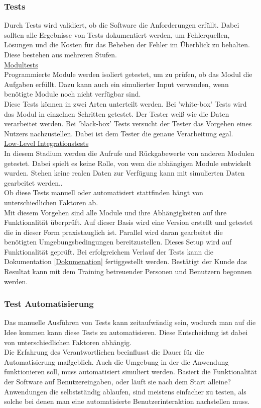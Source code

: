 \documentclass[12pt,a4paper]{article}
\begin{document}
\subsubsection{Tests}
\label{Tests}
Durch Tests wird validiert, ob die Software die Anforderungen erfüllt. Dabei sollten alle Ergebnisse von Tests dokumentiert werden, um Fehlerquellen, Lösungen und die Kosten für das Beheben der Fehler im Überblick zu behalten\cite{rakos1990software}.\\
Diese bestehen aus mehreren Stufen.\\
\underline{Modultests}\\
Programmierte Module werden isoliert getestet, um zu prüfen, ob das Modul die Aufgaben erfüllt. Dazu kann auch ein simulierter Input verwenden, wenn benötigte Module noch nicht verfügbar sind. \\
Diese Tests können in zwei Arten unterteilt werden. Bei 'white-box' Tests wird das Modul in einzelnen Schritten getestet. Der Tester weiß wie die Daten verarbeitet werden. Bei 'black-box' Tests versucht der Tester das Vorgehen eines Nutzers nachzustellen. Dabei ist dem Tester die genaue Verarbeitung egal\cite{rakos1990software}.\\
\underline{Low-Level Integrationstests}\\
In diesem Stadium werden die Aufrufe und Rückgabewerte von anderen Modulen getestet. Dabei spielt es keine Rolle, von wem die abhängigen Module entwickelt wurden. Stehen keine realen Daten zur Verfügung kann mit simulierten Daten gearbeitet werden.\cite{rakos1990software}.\\
Ob diese Tests manuell oder automatisiert stattfinden hängt von unterschiedlichen Faktoren ab.\\
\newline
Mit diesem Vorgehen sind alle Module und ihre Abhängigkeiten auf ihre Funktionalität überprüft. Auf dieser Basis wird eine Version erstellt und getestet die in dieser Form praxistauglich ist. Parallel wird daran gearbeitet die benötigten Umgebungsbedingungen bereitzustellen. Dieses Setup wird auf Funktionalität geprüft. Bei erfolgreichem Verlauf der Tests kann die Dokumentation \ref{Dokumenation} fertiggestellt werden.
Bestätigt der Kunde das Resultat kann mit dem Training betreuender Personen und Benutzern begonnen werden\cite{rakos1990software}.\\
\subsubsection{Test Automatisierung}
Das manuelle Ausführen von Tests kann zeitaufwändig sein, wodurch man auf die Idee kommen kann diese Tests zu automatisieren. Diese Entscheidung ist dabei von unterschiedlichen Faktoren abhängig. \\
Die Erfahrung des Verantwortlichen beeinflusst die Dauer für die Automatisierung maßgeblich. Auch die Umgebung in der die Anwendung funktionieren soll, muss automatisiert simuliert werden. Basiert die Funktionalität der Software auf Benutzereingaben, oder läuft sie nach dem Start alleine? Anwendungen die selbstständig ablaufen, sind meistens einfacher zu testen, als solche bei denen man eine automatisierte Benutzerinteraktion nachstellen muss\cite{fewster1999software}. 
\end{document}
